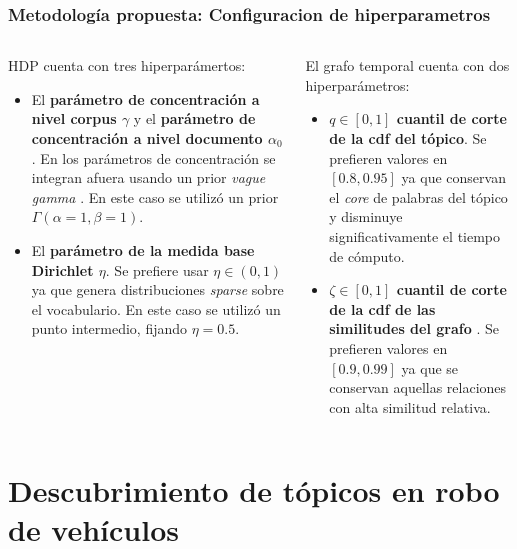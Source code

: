 \documentclass[
	spanish, %
	aspectratio=43, %
	hyperref={pdfencoding=auto,psdextra},
	xcolor={dvipsnames,table,usenames},
]{beamer}
\begin{document}
\begin{frame}[t]
\frametitle{Metodología propuesta: Configuracion de hiperparametros}

\begin{columns}[t]
\begin{column}{0.5\textwidth}
HDP cuenta con tres hiperparámertos:
\begin{itemize} 
  \item El \textbf{parámetro de concentración a nivel corpus $\gamma$} y el \textbf{parámetro de concentración a nivel documento $\alpha_{0}$}. En \cite{teh2005sharing} los parámetros de concentración se integran afuera usando un prior \textit{vague gamma} \cite{escobar1995bayesian}. En este caso se utilizó un prior $\Gamma(\alpha=1, \beta=1)$.
  \item El \textbf{parámetro de la medida base Dirichlet $\eta$}. Se prefiere usar $\eta\in (0,1)$ ya que genera distribuciones \textit{sparse} sobre el vocabulario. En este caso se utilizó un punto intermedio, fijando $\eta=0.5$.\\ 
\end{itemize}
\end{column}

\begin{column}{0.5\textwidth}
El grafo temporal cuenta con dos hiperparámetros:
\begin{itemize}
  \item \textbf{$q \in [0,1]$ cuantil de corte de la cdf del tópico}. Se prefieren valores en $[0.8, 0.95]$ ya que conservan el \textit{core} de palabras del tópico y disminuye significativamente el tiempo de cómputo.
  \item \textbf{$\zeta\in[0,1]$ cuantil de corte de la cdf de las similitudes del grafo }. Se prefieren valores en $[0.9, 0.99]$ ya que se conservan aquellas relaciones con alta similitud relativa.
\end{itemize}
\end{column}
\end{columns}
\end{frame}


\section{Descubrimiento de tópicos en robo de vehículos}
\end{document}
